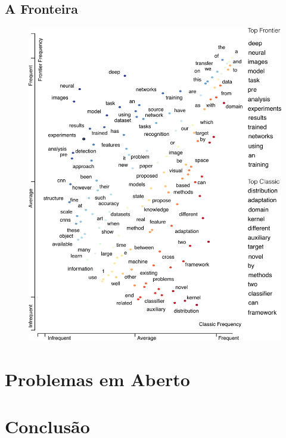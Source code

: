 \documentclass[sigconf]{acmart}
\begin{document}
  \subsection{A Fronteira}\label{fronteira}
  \lipsum[2]
  \begin{figure}
    \includegraphics[width=\columnwidth]{frontier3.pdf}
    \caption{} \label{fig:studysite}
  \end{figure}

\section{Problemas em Aberto}
\lipsum[3]
\section{Conclusão}
\lipsum[3]


\end{document}
